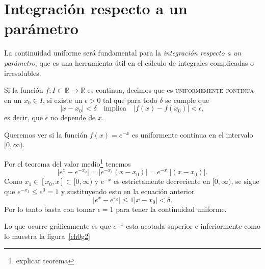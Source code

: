 \documentclass[mid,fleqn,draft,twoside]{notasdeclase}
\newcommand{\R}{\mathbb{R}}
\begin{document}
\section{Integración respecto a un parámetro}
\noindent
La continuidad uniforme será fundamental para la \emph{integración respecto a un parámetro}, que es una herramienta útil en el cálculo de integrales complicadas o irresolubles. 

\begin{defi}\label{cont-uniforme}
	Si la función $f\colon I\subset\R\to\R$ es continua, decimos que es \textup{\textsf{\textsc{uniformemente continua}}} en un $x_0\in I$, si existe un $\epsilon>0$ tal que para todo $\delta$ se cumple que
	\[ |x-x_0| <\delta\quad\text{implica}\quad |f(x)-f(x_0)| <\epsilon, \]
	es decir, que $\epsilon$ no depende de $x$.
\end{defi}

\begin{ejem}\label{ejeme-x}
	Queremos ver si la función $f(x) = e^{-x}$ es uniformente continua en el intervalo $[0,\infty)$.
	
	Por el teorema del valor medio\footnote{explicar teorema} tenemos
	\[ |e^x-e^{-x_0}| = |e^{-x_1} (x-x_0)|  = e^{-x_1}| (x-x_0)|. \]
	Como $x_1\in [x_0,x]\subset[0,\infty)$ y $e^{-x}$ es estrictamente decreciente en $[0,\infty)$, se sigue que $e^{-x_1} \leq e^0=1$ y sustituyendo esto en la ecuación anterior
	\[ |e^x - e^{x_0}|\leq 1|x-x_0| <\delta. \]
	Por lo tanto basta con tomar $\epsilon=1$ para tener la continuidad uniforme.
	
	Lo que ocurre gráficamente es que $e^{-x}$ esta acotada superior e inferiormente como lo muestra la figura~\ref{ch0g2}
\end{ejem}
\end{document}
